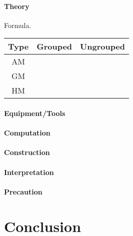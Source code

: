 \documentclass[a4paper,oneside, margin=1.4in]{book}
\begin{document}
\subsubsection{Theory}

Formula. 

\begin{table}[h]
\centering
\begin{tabular}{c|c|c}
Type & Grouped & Ungrouped \\ \hline
AM &  &  \\ \hline
GM &  &  \\ \hline
HM &  & 
\end{tabular}
\end{table}

\subsubsection{Equipment/Tools}

\subsubsection{Computation}

\subsubsection{Construction}

\subsubsection{Interpretation}

\subsubsection{Precaution}

\backmatter
\chapter{Conclusion}
\lipsum[8]

\tableofcontents
\end{document}

